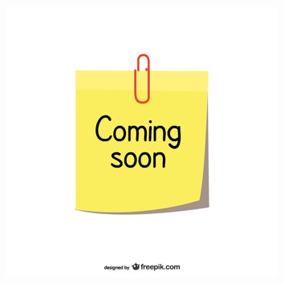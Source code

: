 \documentclass{beamer}
\begin{document}
\begin{frame}
\begin{columns}[t]
			\includegraphics[scale= 0.3]{coming-soon}
		\end{columns}
	\end{frame}
	
		
	
	
	
\end{document}
